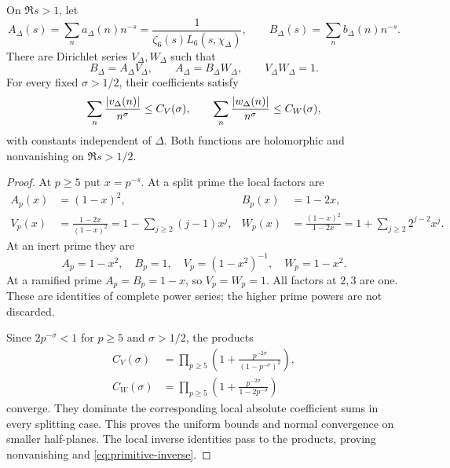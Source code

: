 \begin{theorem}\label{thm:primitive}
On $\Re s>1$, let
\[
 A_\Delta(s)=\sum_n a_\Delta(n)n^{-s}
 =\frac1{\zeta_6(s)L_6(s,\chi_\Delta)},\qquad
 B_\Delta(s)=\sum_n b_\Delta(n)n^{-s}.
\]
There are Dirichlet series $V_\Delta,W_\Delta$ such that
\begin{equation}\label{eq:primitive-inverse}
 B_\Delta=A_\Delta V_\Delta,\qquad
 A_\Delta=B_\Delta W_\Delta,\qquad V_\Delta W_\Delta=1.
\end{equation}
For every fixed $\sigma>1/2$, their coefficients satisfy
\[
 \sum_n\frac{\lvert v_\Delta(n)\rvert}{n^\sigma}\le C_V(\sigma),\qquad
 \sum_n\frac{\lvert w_\Delta(n)\rvert}{n^\sigma}\le C_W(\sigma),
\]
with constants independent of $\Delta$. Both functions are holomorphic and nonvanishing on $\Re s>1/2$.
\end{theorem}
\begin{proof}
At $p\ge5$ put $x=p^{-s}$. At a split prime the local factors are
\begin{align*}
 A_p(x)&=(1-x)^2,& B_p(x)&=1-2x,\\
 V_p(x)&=\frac{1-2x}{(1-x)^2}
       =1-\sum_{j\ge2}(j-1)x^j,&
 W_p(x)&=\frac{(1-x)^2}{1-2x}
       =1+\sum_{j\ge2}2^{j-2}x^j.
\end{align*}
At an inert prime they are
\[
 A_p=1-x^2,\quad B_p=1,\quad
 V_p=(1-x^2)^{-1},\quad W_p=1-x^2.
\]
At a ramified prime $A_p=B_p=1-x$, so $V_p=W_p=1$. All factors at $2,3$ are one. These are identities of complete power series; the higher prime powers are not discarded.

Since $2p^{-\sigma}<1$ for $p\ge5$ and $\sigma>1/2$, the products
\begin{align*}
 C_V(\sigma)&=\prod_{p\ge5}
  \left(1+\frac{p^{-2\sigma}}{(1-p^{-\sigma})^2}\right),\\
 C_W(\sigma)&=\prod_{p\ge5}
  \left(1+\frac{p^{-2\sigma}}{1-2p^{-\sigma}}\right)
\end{align*}
converge. They dominate the corresponding local absolute coefficient sums in every splitting case. This proves the uniform bounds and normal convergence on smaller half-planes. The local inverse identities pass to the products, proving nonvanishing and \eqref{eq:primitive-inverse}.
\end{proof}

